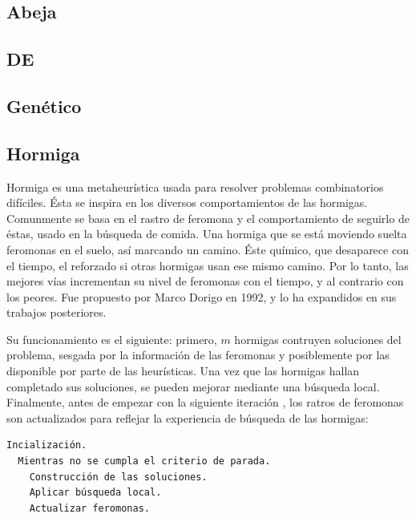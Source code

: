 \subsection{Abeja}

\subsection{DE}

\subsection{Gen\'etico}

\subsection{Hormiga}

Hormiga es una metaheurística usada para resolver problemas combinatorios
difíciles. \'Esta se inspira en los diversos comportamientos de las hormigas.
Comunmente se basa en el rastro de feromona y el comportamiento de seguirlo 
de éstas, usado en la búsqueda de comida. Una hormiga que se est\'a moviendo 
suelta feromonas en el suelo, as\'i marcando un camino. \'Este químico, que 
desaparece con el tiempo, el reforzado si otras hormigas usan ese mismo camino.
Por lo tanto, las mejores v\'ias incrementan su nivel de feromonas con el tiempo, 
y al contrario con los peores. Fue propuesto por Marco Dorigo en 1992, 
y lo ha expandidos en sus trabajos posteriores.
\cite{GePo2010} \cite{Le2007}

Su funcionamiento es el siguiente: primero, $m$ hormigas contruyen
soluciones del problema, sesgada por la informaci\'on de las feromonas y posiblemente
por las disponible por parte de las heur\'isticas. Una vez que las hormigas hallan completado
sus soluciones, se pueden mejorar mediante una b\'usqueda local. Finalmente,
antes de empezar con la siguiente iteraci\'on , los ratros de feromonas son
actualizados para reflejar la experiencia de b\'usqueda de las hormigas:

\begin{lstlisting}[mathescape, language=Pascal]
  Incialización.
  Mientras no se cumpla el criterio de parada.
    Construcción de las soluciones.
    Aplicar búsqueda local.
    Actualizar feromonas.
\end{lstlisting}

